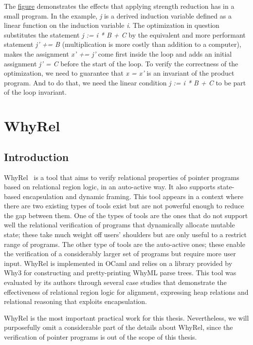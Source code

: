 The \hyperref[fig:induction_var_strength_red]{figure} demonstrates the effects that applying strength reduction has in a small program.
In the example, \emph{j} is a derived induction variable defined as a linear function on the induction variable \emph{i}.
The optimization in question substitutes the statement \emph{j := i * B + C} by the equivalent and more performant statement \emph{j' += B} (multiplication is more costly than addition to a computer), makes the assignment \emph{x' += j'} come first inside the loop and adds an initial assignment \emph{j' = C} before the start of the loop.
To verify the correctness of the optimization, we need to guarantee that \emph{x = x'} is an invariant of the product program.
And to do that, we need the linear condition \emph{j := i * B + C} to be part of the loop invariant.

\FloatBarrier
\section{WhyRel}
\label{sec:whyrel}

\subsection{Introduction}
\label{subsec:whyrel_intro}

WhyRel~\cite{whyrel} is a tool that aims to verify relational properties of pointer programs based on relational region logic, in an auto-active way.
It also supports state-based encapsulation and dynamic framing. 
This tool appears in a context where there are two existing types of tools exist but are not powerful enough to reduce the gap between them.
One of the types of tools are the ones that do not support well the relational verification of programs that dynamically allocate mutable state; these take much weight off users' shoulders but are only useful to a restrict range of programs.
The other type of tools are the auto-active ones; these enable the verification of a considerably larger set of programs but require more user input.
WhyRel is implemented in OCaml and relies on a library provided by Why3 for constructing and pretty-printing WhyML parse trees.
This tool was evaluated by its authors through several case studies that demonstrate the effectiveness of relational region logic for alignment, expressing heap relations and relational reasoning that exploits encapsulation.

WhyRel is the most important practical work for this thesis.
Nevertheless, we will purposefully omit a considerable part of the details about WhyRel, since the verification of pointer programs is out of the scope of this thesis.


